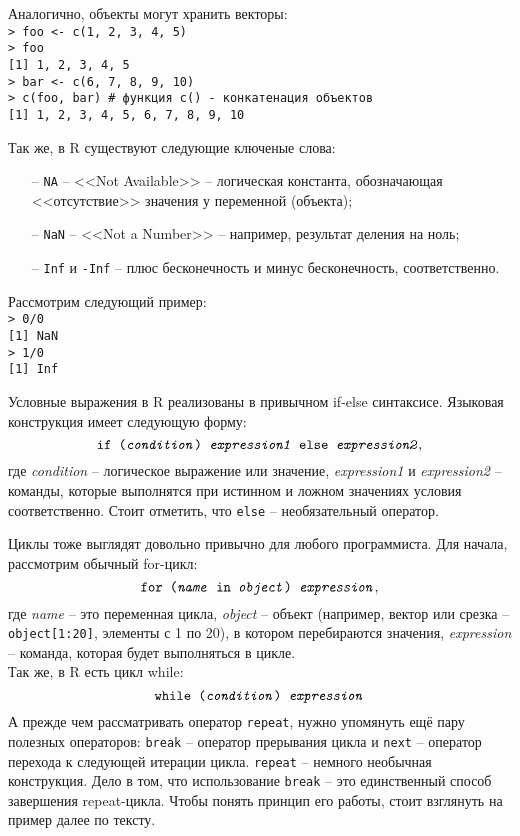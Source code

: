     Аналогично, объекты могут хранить векторы: \\
    \indent \texttt{> foo <- c(1, 2, 3, 4, 5)} \\
    \indent \texttt{> foo} \\
    \indent \texttt{[1] 1, 2, 3, 4, 5} \\
    \indent \texttt{> bar <- c(6, 7, 8, 9, 10)} \\
    \indent \texttt{> c(foo, bar) \# функция c() - конкатенация объектов} \\
    \indent \texttt{[1] 1, 2, 3, 4, 5, 6, 7, 8, 9, 10} 

    Так же, в R существуют следующие ключеные слова:
    \begin{itemize}
        \item[--] \texttt{NA} -- <<Not Available>> -- логическая константа, обозначающая
            <<отсутствие>> значения у переменной (объекта);
        \item[--] \texttt{NaN} -- <<Not a Number>> -- например, результат деления на ноль;
        \item[--] \texttt{Inf} и \texttt{-Inf} -- плюс бесконечность и минус бесконечность,
            соответственно.
    \end{itemize}

    Рассмотрим следующий пример:\\
    \indent\texttt{> 0/0} \\
    \indent\texttt{[1] NaN} \\
    \indent\texttt{> 1/0} \\
    \indent\texttt{[1] Inf}



    Условные выражения в R реализованы в привычном if-else синтаксисе. Языковая конструкция
    имеет следующую форму:  
    $$ \texttt{if (\textit{condition}) \textit{expression1} else \textit{expression2}}, $$
    где \textit{condition} -- логическое выражение или значение, \textit{expression1} и 
    \textit{expression2} -- команды, которые выполнятся при истинном и ложном значениях 
    условия соответственно. Стоит отметить, что \texttt{else} -- необязательный оператор.

    Циклы тоже выглядят довольно привычно для любого программиста. Для начала, рассмотрим
    обычный for-цикл: 
    $$ \texttt{for (\textit{name} in \textit{object}) \textit{expression}}, $$
    где \textit{name} -- это переменная цикла, \textit{object} -- объект (например, вектор
    или срезка -- \texttt{object[1:20]}, элементы с 1 по 20), в котором перебираются 
    значения, \textit{expression} -- команда, которая будет выполняться в цикле. \\
    Так же, в R есть цикл while:
    $$ \texttt{while (\textit{condition}) \textit{expression}} $$
    \indent А прежде чем рассматривать оператор \texttt{repeat}, нужно упомянуть ещё пару 
    полезных операторов: \texttt{break} -- оператор прерывания цикла и \texttt{next} -- 
    оператор перехода к следующей итерации цикла. \texttt{repeat} -- немного необычная 
    конструкция. Дело в том, что использование \texttt{break} -- это единственный способ
    завершения repeat-цикла. Чтобы понять принцип его работы, стоит взглянуть на пример
    далее по тексту.

